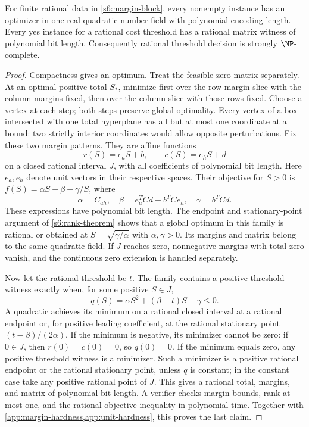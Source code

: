 \begin{theorem}
\label{app:margin-certificates}
For finite rational data in \eqref{s6:margin-block}, every nonempty
instance has an optimizer in one real quadratic number field with
polynomial encoding length. Every yes instance for a rational cost
threshold has a rational matrix witness of polynomial bit length.
Consequently rational threshold decision is strongly $\NP$-complete.
\end{theorem}
\begin{proof}
Compactness gives an optimum. Treat the feasible zero matrix separately.
At an optimal positive total $S_*$, minimize first over the row-margin
slice with the column margins fixed, then over the column slice with
those rows fixed. Choose a vertex at each step; both steps preserve
global optimality. Every vertex of a box intersected with one total
hyperplane has all but at most one coordinate at a bound: two strictly
interior coordinates would allow opposite perturbations. Fix these two
margin patterns. They are affine functions
\[
 r(S)=e_aS+b,\qquad c(S)=e_hS+d
\]
on a closed rational interval $J$, with all coefficients of polynomial
bit length. Here $e_a,e_h$ denote unit vectors in their respective spaces.
Their objective for $S>0$ is
$f(S)=\alpha S+\beta+\gamma/S$, where
\[
 \alpha=C_{ah},\quad
 \beta=e_a^TCd+b^TCe_h,\quad \gamma=b^TCd.
\]
These expressions have polynomial bit length. The endpoint and
stationary-point argument of \cref{s6:rank-theorem} shows that a global
optimum in this family is rational or obtained at
$S=\sqrt{\gamma/\alpha}$ with $\alpha,\gamma>0$. Its margins and
matrix belong to the same quadratic field. If $J$ reaches zero,
nonnegative margins with total zero vanish, and the continuous
zero extension is handled separately.

Now let the rational threshold be $t$. The family contains a positive
threshold witness exactly when, for some positive $S\in J$,
\[
 q(S)=\alpha S^2+(\beta-t)S+\gamma\le0.
\]
A quadratic achieves its minimum on a rational closed interval at a
rational endpoint or, for positive leading coefficient, at the rational
stationary point $(t-\beta)/(2\alpha)$. If the minimum is negative,
its minimizer cannot be zero: if $0\in J$, then $r(0)=c(0)=0$, so
$q(0)=0$. If the minimum equals zero, any positive threshold witness is
a minimizer. Such a minimizer is a positive rational endpoint or the
rational stationary point, unless $q$ is constant; in the constant case
take any positive rational point of $J$. This gives a rational total,
margins, and matrix of polynomial bit length.
A verifier checks margin bounds, rank at most one, and the rational
objective inequality in polynomial time. Together with
\cref{app:margin-hardness,app:unit-hardness}, this proves the last claim.
\end{proof}

